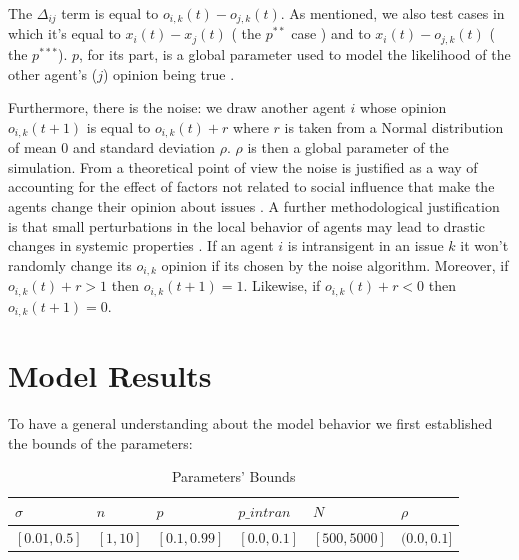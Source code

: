 \documentclass{article}
\begin{document}
The \(\Delta_{ij} \) term is equal to \( o_{i,k} (t) - o_{j,k} (t)\). As
mentioned, we also test cases in which it's equal to \( x_i(t) - x_j(t) \) ( the
\(p^{**}\) case ) and to \(x_{i}(t) - o_{j,k}(t)\) ( the \(p^{***}\)). \(p\),
for its part, is a global parameter used to model the likelihood of the other
agent's (\(j\)) opinion being true \cite{martins12b}.

Furthermore, there is the noise: we draw another agent \(i\) whose opinion \(
o_{i,k}(t+1)\) is equal to \(o_{i,k}(t) + r\) where \(r\) is taken from a Normal
distribution of mean 0 and standard deviation \(\rho\). \(\rho\) is then a
global parameter of the simulation. From a theoretical point of view the noise
is justified as a way of accounting for the effect of factors not related to
social influence that make the agents change their opinion about issues
\cite{flache2017}. A further methodological justification is that small
perturbations in the local behavior of agents may lead to drastic changes in
systemic properties \cite{macy2015signal}. If an agent \(i\) is intransigent in
an issue \(k\) it won't randomly change its \(o_{i,k}\) opinion if its chosen by
the noise algorithm. Moreover, if \(o_{i,k}(t) + r > 1\) then \( o_{i,k}(t+1) =
1\). Likewise, if \(o_{i,k}(t) + r < 0 \) then \( o_{i,k}(t+1) = 0\).

  \section{Model Results}

  
  To have a general understanding about the model behavior we first established
  the bounds of the parameters:

  \begin{table}[H]
    \centering
\begin{tabular}{@{}|l|l|l|l|l|l|@{}}
\toprule
\rowcolor[HTML]{EFEFEF} 
$\sigma$ & $n$ & $p$ & $p\_intran$ & $N$ & $\rho$ \\ \midrule
$[0.01, 0.5]$ & $[1, 10]$  & $[0.1, 0.99]$ & $[0.0, 0.1]$ & $[500, 5000]$ & $(0.0, 0.1]$ \\ \bottomrule
\end{tabular}
\caption{Parameters' Bounds}
\end{table}
\end{document}

